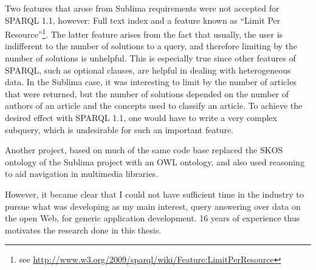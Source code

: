 Two features that arose from Sublima requirements were not accepted
for SPARQL 1.1, however: Full text index and a feature known as
``Limit Per Resource''\footnote{see
  \url{http://www.w3.org/2009/sparql/wiki/Feature:LimitPerResource}}. The
latter feature arises from the fact that usually, the user is
indifferent to the number of solutions to a query, and therefore
limiting by the number of solutions is unhelpful. This is especially
true since other features of SPARQL, such as optional clauses, are
helpful in dealing with heterogeneous data. In the Sublima case, it
was interesting to limit by the number of articles that were returned,
but the number of solutions depended on the number of authors of an
article and the concepts used to classify an article. To achieve the
desired effect with SPARQL 1.1, one would have to write a very complex
subquery, which is undesirable for such an important feature.


Another project, based on much of the same code
base replaced the SKOS ontology of the Sublima project with an OWL
ontology, and also used reasoning to aid navigation in multimedia
libraries.



However, it became clear that I could not have sufficient time in the
industry to pursue what was developing as my main interest, query
answering over data on the open Web, for generic application
development. 16 years of experience thus motivates the research done
in this thesis.

